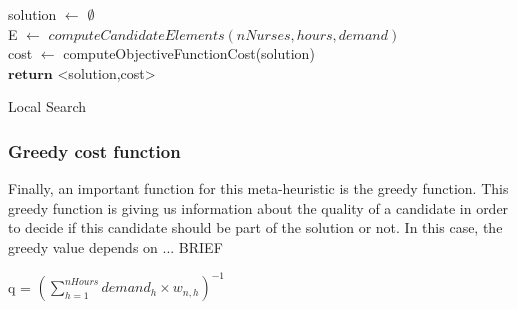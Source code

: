 \begin{algorithm}[H]


solution $\leftarrow$ $\emptyset$ \\
E $\leftarrow$ $computeCandidateElements(nNurses, hours, demand)$ \\
cost $\leftarrow$ computeObjectiveFunctionCost(solution)\\
$\textbf{return}$ <solution,cost>
\caption{Local Search}\label{alg.mainLoop}
\end{algorithm}

\subsubsection{Greedy cost function}

Finally, an important function for this meta-heuristic is the greedy function. This greedy function is giving us information about the quality of a candidate in order to decide if this candidate should
be part of the solution or not. In this case, the greedy value depends on ... BRIEF

\begin{center}
q = $(\sum_{h=1}^{nHours} demand_h \times w_{n,h})^{-1}$
\end{center}

\pagebreak